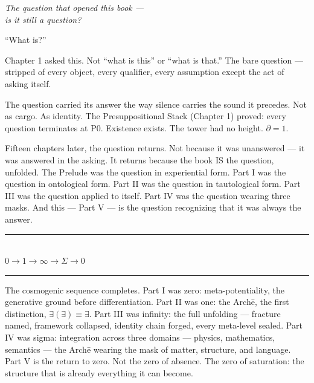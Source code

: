 \documentclass[10pt, openany, oneside]{book}
\renewcommand{\normalsize}{\fontsize{10}{13}\selectfont}
\begin{document}
\vspace{1.5em}

\begin{center}
    \itshape
    The question that opened this book ---\\
    is it still a question?
\end{center}

\vspace{2em}


\noindent ``What is?''

Chapter 1 asked this. Not ``what is this'' or ``what is that.'' The bare question --- stripped of every object, every qualifier, every assumption except the act of asking itself.

The question carried its answer the way silence carries the sound it precedes. Not as cargo. As identity. The Presuppositional Stack (Chapter 1) proved: every question terminates at P0. Existence exists. The tower had no height. $\partial = 1$.

Fifteen chapters later, the question returns. Not because it was unanswered --- it was answered in the asking. It returns because the book IS the question, unfolded. The Prelude was the question in experiential form. Part I was the question in ontological form. Part II was the question in tautological form. Part III was the question applied to itself. Part IV was the question wearing three masks. And this --- Part V --- is the question recognizing that it was always the answer.

\vspace{1.5em}


\begin{center}
    \rule{0.3\textwidth}{0.4pt}\\[0.5em]
    {\normalsize\bfseries\scshape $0 \to 1 \to \infty \to \Sigma \to 0$}\\[0.3em]
    \rule{0.3\textwidth}{0.4pt}
\end{center}

\vspace{1em}

\noindent The cosmogenic sequence completes. Part I was zero: meta-potentiality, the generative ground before differentiation. Part II was one: the Arch\={e}, the first distinction, $\exists(\exists) \equiv \exists$. Part III was infinity: the full unfolding --- fracture named, framework collapsed, identity chain forged, every meta-level sealed. Part IV was sigma: integration across three domains --- physics, mathematics, semantics --- the Arch\={e} wearing the mask of matter, structure, and language. Part V is the return to zero. Not the zero of absence. The zero of saturation: the structure that is already everything it can become.
\end{document}
